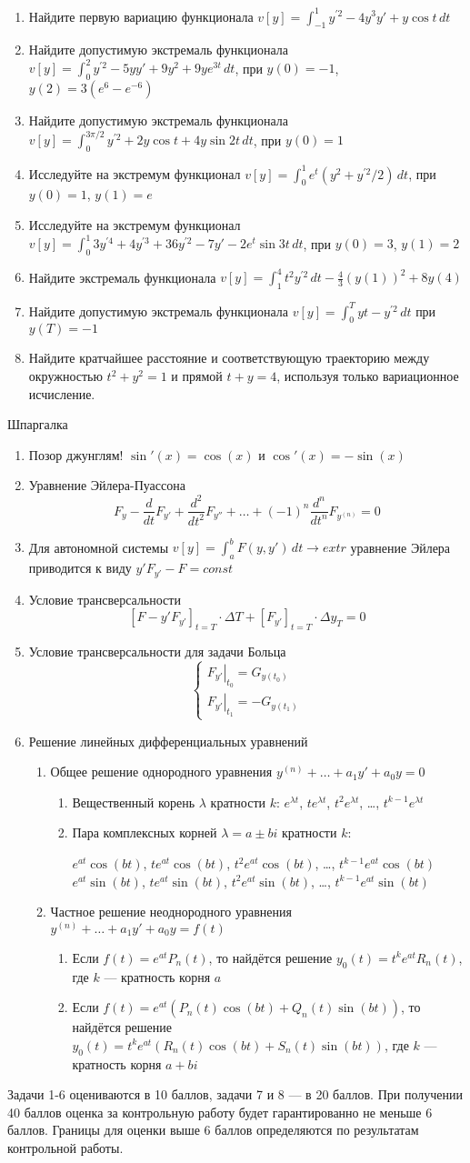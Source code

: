 \documentclass[pdftex,12pt,a4paper]{article}
\newcommand{\shpargalka}{Шпаргалка

\begin{enumerate}
\item Позор джунглям! $\sin'(x)=\cos(x)$ и $\cos'(x)=-\sin(x)$

\item Уравнение Эйлера-Пуассона
\[
F_y-\frac{d}{dt}F_{y'}+\frac{d^2}{dt^2}F_{y''}+\ldots+(-1)^n\frac{d^n}{dt^n}F_{y^{(n)}}=0
\]

\item Для автономной системы $v[y]=\int_a^b F(y,y')\, dt \to extr$ уравнение Эйлера приводится к виду $y'F_{y'}-F=const$

\item Условие трансверсальности 
\[
[F-y'F_{y'}]_{t=T}\cdot \Delta T + [F_{y'}]_{t=T}\cdot \Delta y_T=0
\]

\item Условие трансверсальности для задачи Больца
\[
\begin{cases}
\left. F_{y'}\right|_{t_0}=G_{y(t_0)} \\
\left. F_{y'}\right|_{t_1}=-G_{y(t_1)}
\end{cases}
\]

\item Решение линейных дифференциальных уравнений

\begin{enumerate}
\item Общее решение однородного уравнения $y^{(n)}+\ldots+a_1 y'+a_0 y=0$
\begin{enumerate}
\item Вещественный корень $\lambda$ кратности $k$: $e^{\lambda t}$, $te^{\lambda t}$, $t^2e^{\lambda t}$, \ldots, $t^{k-1}e^{\lambda t}$
\item Пара комплексных корней $\lambda=a\pm bi$  кратности $k$:

$e^{at}\cos(bt)$, $te^{at}\cos(bt)$, $t^2e^{at}\cos(bt)$, \ldots, $t^{k-1}e^{at}\cos(bt)$ \\
$e^{at}\sin(bt)$, $te^{at}\sin(bt)$, $t^2e^{at}\sin(bt)$, \ldots, $t^{k-1}e^{at}\sin(bt)$
\end{enumerate}
\item Частное решение неоднородного уравнения $y^{(n)}+\ldots+a_1 y'+a_0 y=f(t)$
\begin{enumerate}
\item Если $f(t)=e^{at}P_n(t)$, то найдётся решение $y_0(t)=t^k e^{at} R_n(t)$, где $k$ --- кратность корня $a$
\item Если $f(t)=e^{at}(P_n(t)\cos(bt)+Q_n(t)\sin(bt))$, то найдётся решение \\
$y_0(t)=t^k e^{at}(R_n(t)\cos(bt)+S_n(t)\sin(bt))$, где $k$ --- кратность корня $a+bi$
\end{enumerate}
\end{enumerate}

\end{enumerate}
}
\begin{document}
\vspace{20pt}

\begin{enumerate}
\item Найдите первую вариацию функционала $v[y]=\int_{-1}^1 y^{\prime 2} -4y^3 y'+y\cos t \, dt$
\item Найдите допустимую экстремаль функционала
$v[y]=\int_0^2 y^{\prime 2} -5yy'+9y^2+9ye^{3t} \, dt$, при $y(0)=-1$, $y(2)=3(e^6-e^{-6})$

\item Найдите допустимую экстремаль функционала
$v[y]=\int_0^{3\pi/2} y^{\prime 2} +2y\cos t +4y\sin 2t \, dt$, при $y(0)=1$

\item Исследуйте на экстремум функционал $v[y]=\int_0^1 e^t \left(y^2+y^{\prime 2}/2 \right) \, dt$, при $y(0)=1$, $y(1)=e$

\item Исследуйте на экстремум функционал $v[y]=\int_0^1 3y^{\prime 4} +4y^{\prime 3}+36y^{\prime 2}-7y'-2e^t \sin 3t \, dt$, при $y(0)=3$, $y(1)=2$

\item Найдите экстремаль функционала $v[y]=\int_1^4 t^2 y^{\prime 2} \, dt-\frac{4}{3}(y(1))^2+8y(4)$

\item Найдите допустимую экстремаль функционала $v[y]=\int_0^T yt-y^{\prime 2} \, dt$ при $y(T)=-1$

\item Найдите кратчайшее расстояние и соответствующую траекторию между окружностью $t^2+y^2=1$ и прямой $t+y=4$, используя только вариационное исчисление.

\end{enumerate}

\vspace{40pt}

\shpargalka

\newpage
Задачи 1-6 оцениваются в 10 баллов, задачи 7 и 8 --- в 20 баллов. При получении 40 баллов оценка за контрольную работу будет гарантированно не меньше 6 баллов. Границы для оценки выше 6 баллов определяются по результатам контрольной работы.

\vspace{20pt}
\end{document}
